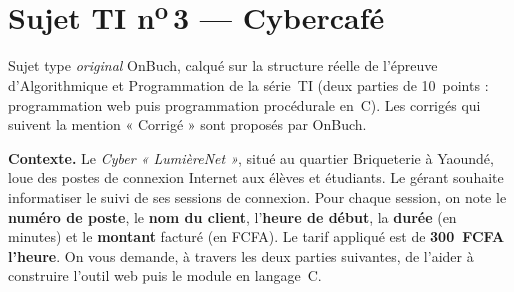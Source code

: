 \section{Sujet TI n\textsuperscript{o}\,3 — Cybercafé}

\begin{center}
\setlength{\fboxsep}{8pt}
\end{center}

\begin{remarque}
Sujet type \emph{original} OnBuch, calqué sur la structure réelle de l'épreuve
d'Algorithmique et Programmation de la série~TI (deux parties de 10~points :
programmation web puis programmation procédurale en~C). Les corrigés qui suivent
la mention « Corrigé » sont proposés par OnBuch.
\end{remarque}

\noindent\textbf{Contexte.} Le \textit{Cyber « LumièreNet »}, situé au quartier
Briqueterie à Yaoundé, loue des postes de connexion Internet aux élèves et
étudiants. Le gérant souhaite informatiser le suivi de ses sessions de connexion.
Pour chaque session, on note le \textbf{numéro de poste}, le \textbf{nom du
client}, l'\textbf{heure de début}, la \textbf{durée} (en minutes) et le
\textbf{montant} facturé (en FCFA). Le tarif appliqué est de \textbf{300~FCFA
l'heure}. On vous demande, à travers les deux parties suivantes, de l'aider à
construire l'outil web puis le module en langage~C.

